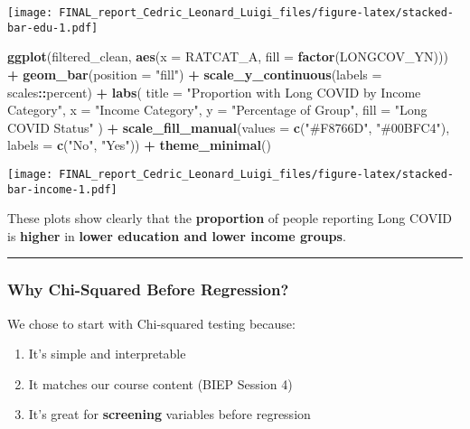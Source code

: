 \documentclass[
]{article}
\newenvironment{Shaded}{\begin{snugshade}}{\end{snugshade}}
\newcommand{\AttributeTok}[1]{\textcolor[rgb]{0.13,0.29,0.53}{#1}}
\newcommand{\FunctionTok}[1]{\textcolor[rgb]{0.13,0.29,0.53}{\textbf{#1}}}
\newcommand{\NormalTok}[1]{#1}
\newcommand{\SpecialCharTok}[1]{\textcolor[rgb]{0.81,0.36,0.00}{\textbf{#1}}}
\newcommand{\StringTok}[1]{\textcolor[rgb]{0.31,0.60,0.02}{#1}}
\providecommand{\tightlist}{%
  \setlength{\itemsep}{0pt}\setlength{\parskip}{0pt}}
\begin{document}
\texttt{[image: FINAL\_report\_Cedric\_Leonard\_Luigi\_files/figure-latex/stacked-bar-edu-1.pdf]}

\begin{Shaded}
\begin{Highlighting}[]
\FunctionTok{ggplot}\NormalTok{(filtered\_clean, }\FunctionTok{aes}\NormalTok{(}\AttributeTok{x =}\NormalTok{ RATCAT\_A, }\AttributeTok{fill =} \FunctionTok{factor}\NormalTok{(LONGCOV\_YN))) }\SpecialCharTok{+}
  \FunctionTok{geom\_bar}\NormalTok{(}\AttributeTok{position =} \StringTok{"fill"}\NormalTok{) }\SpecialCharTok{+}
  \FunctionTok{scale\_y\_continuous}\NormalTok{(}\AttributeTok{labels =}\NormalTok{ scales}\SpecialCharTok{::}\NormalTok{percent) }\SpecialCharTok{+}
  \FunctionTok{labs}\NormalTok{(}
    \AttributeTok{title =} \StringTok{"Proportion with Long COVID by Income Category"}\NormalTok{,}
    \AttributeTok{x =} \StringTok{"Income Category"}\NormalTok{,}
    \AttributeTok{y =} \StringTok{"Percentage of Group"}\NormalTok{,}
    \AttributeTok{fill =} \StringTok{"Long COVID Status"}
\NormalTok{  ) }\SpecialCharTok{+}
  \FunctionTok{scale\_fill\_manual}\NormalTok{(}\AttributeTok{values =} \FunctionTok{c}\NormalTok{(}\StringTok{"\#F8766D"}\NormalTok{, }\StringTok{"\#00BFC4"}\NormalTok{), }\AttributeTok{labels =} \FunctionTok{c}\NormalTok{(}\StringTok{"No"}\NormalTok{, }\StringTok{"Yes"}\NormalTok{)) }\SpecialCharTok{+}
  \FunctionTok{theme\_minimal}\NormalTok{()}
\end{Highlighting}
\end{Shaded}

\texttt{[image: FINAL\_report\_Cedric\_Leonard\_Luigi\_files/figure-latex/stacked-bar-income-1.pdf]}

These plots show clearly that the \textbf{proportion} of people
reporting Long COVID is \textbf{higher} in \textbf{lower education and
lower income groups}.

\begin{center}\rule{0.5\linewidth}{0.5pt}\end{center}

\subsubsection{Why Chi-Squared Before
Regression?}\label{why-chi-squared-before-regression}

We chose to start with Chi-squared testing because:

\begin{enumerate}
\def\labelenumi{\arabic{enumi}.}
\tightlist
\item
  It's simple and interpretable
\item
  It matches our course content (BIEP Session 4)
\item
  It's great for \textbf{screening} variables before regression
\end{enumerate}
\end{document}
